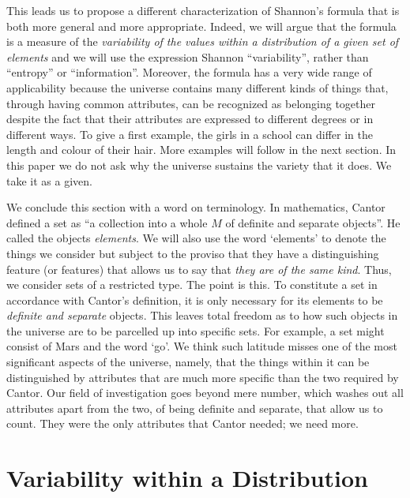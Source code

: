 \documentclass{article}
\begin{document}
This leads us to propose a different characterization of Shannon's formula that is both more general and more appropriate. Indeed, we will argue that the formula is a measure of the \emph{variability of the values within a distribution of a given set of elements} and we will use the expression Shannon ``variability'', rather than ``entropy'' or ``information''. Moreover, the formula has a very wide range of applicability because the universe contains many different kinds of things that, through having common attributes, can be recognized as belonging together despite the fact that their attributes are expressed to different degrees or in different ways. To give a first example, the girls in a school can differ in the length and colour of their hair. More examples will follow in the next section. In this paper we do not ask why the universe sustains the variety that it does. We take it as a given.

We conclude this section with a word on terminology. In mathematics, Cantor defined a set as ``a collection into a whole $M$ of definite and separate objects''. He called the objects \emph{elements}. We will also use the word `elements' to denote the things we consider but subject to the proviso that they have a distinguishing feature (or features) that allows us to say that \emph{they are of the same kind}. Thus, we consider sets of a restricted type. The point is this. To constitute a set in accordance with Cantor's definition, it is only necessary for its elements to be \emph{definite and separate} objects. This leaves total freedom as to how such objects in the universe are to be parcelled up into specific sets. For example, a set might consist of Mars and the word `go'. We think such latitude misses one of the most significant aspects of the universe, namely, that the things within it can be distinguished by attributes that are much more specific than the two required by Cantor. Our field of investigation goes beyond mere number, which washes out all attributes apart from the two, of being definite and separate, that allow us to count. They were the only attributes that Cantor needed; we need more.


\section{Variability within a Distribution\label{vwd}}
\end{document}
